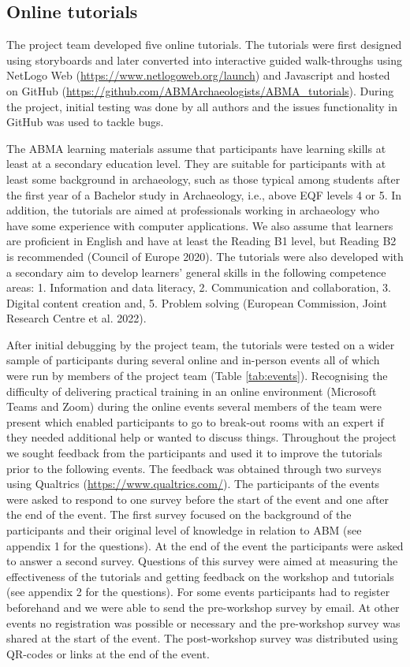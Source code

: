 \documentclass[
]{article}
\begin{document}
\hypertarget{online-tutorials}{%
\subsection{Online tutorials}\label{online-tutorials}}

The project team developed five online tutorials. The tutorials were first designed using storyboards and later converted into interactive guided walk-throughs using NetLogo Web (\url{https://www.netlogoweb.org/launch}) and Javascript and hosted on GitHub (\url{https://github.com/ABMArchaeologists/ABMA_tutorials}). During the project, initial testing was done by all authors and the issues functionality in GitHub was used to tackle bugs.

The ABMA learning materials assume that participants have learning skills at least at a secondary education level. They are suitable for participants with at least some background in archaeology, such as those typical among students after the first year of a Bachelor study in Archaeology, i.e., above EQF levels 4 or 5. In addition, the tutorials are aimed at professionals working in archaeology who have some experience with computer applications. We also assume that learners are proficient in English and have at least the Reading B1 level, but Reading B2 is recommended (Council of Europe 2020). The tutorials were also developed with a secondary aim to develop learners' general skills in the following competence areas: 1. Information and data literacy, 2. Communication and collaboration, 3. Digital content creation and, 5. Problem solving (European Commission, Joint Research Centre et al. 2022).

After initial debugging by the project team, the tutorials were tested on a wider sample of participants during several online and in-person events all of which were run by members of the project team (Table \ref{tab:events}). Recognising the difficulty of delivering practical training in an online environment (Microsoft Teams and Zoom) during the online events several members of the team were present which enabled participants to go to break-out rooms with an expert if they needed additional help or wanted to discuss things. Throughout the project we sought feedback from the participants and used it to improve the tutorials prior to the following events. The feedback was obtained through two surveys using Qualtrics (\url{https://www.qualtrics.com/}). The participants of the events were asked to respond to one survey before the start of the event and one after the end of the event. The first survey focused on the background of the participants and their original level of knowledge in relation to ABM (see appendix 1 for the questions). At the end of the event the participants were asked to answer a second survey. Questions of this survey were aimed at measuring the effectiveness of the tutorials and getting feedback on the workshop and tutorials (see appendix 2 for the questions). For some events participants had to register beforehand and we were able to send the pre-workshop survey by email. At other events no registration was possible or necessary and the pre-workshop survey was shared at the start of the event. The post-workshop survey was distributed using QR-codes or links at the end of the event.
\end{document}

